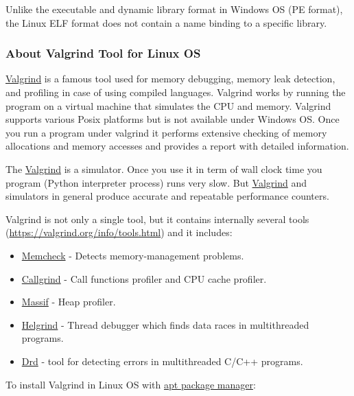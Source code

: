 \documentclass[
]{article}
\begin{document}
Unlike the executable and dynamic library format in Windows OS (PE
format), the Linux ELF format does not contain a name binding to a
specific library.

\hypertarget{about-valgrind-tool-for-linux-os}{%
\subsubsection{About Valgrind Tool for Linux
OS}\label{about-valgrind-tool-for-linux-os}}

\href{https://valgrind.org/}{Valgrind} is a famous tool used for memory
debugging, memory leak detection, and profiling in case of using
compiled languages. Valgrind works by running the program on a virtual
machine that simulates the CPU and memory. Valgrind supports various
Posix platforms but is not available under Windows OS. Once you run a
program under valgrind it performs extensive checking of memory
allocations and memory accesses and provides a report with detailed
information.

The \href{https://valgrind.org/}{Valgrind} is a simulator. Once you use
it in term of wall clock time you program (Python interpreter process)
runs very slow. But \href{https://valgrind.org/}{Valgrind} and
simulators in general produce accurate and repeatable performance
counters.

Valgrind is not only a single tool, but it contains internally several
tools (\url{https://valgrind.org/info/tools.html}) and it includes:

\begin{itemize}
\item
  \href{https://valgrind.org/docs/manual/mc-manual.html}{Memcheck} -
  Detects memory-management problems.
\item
  \href{https://valgrind.org/docs/manual/cl-manual.html}{Callgrind} -
  Call functions profiler and CPU cache profiler.
\item
  \href{https://valgrind.org/docs/manual/ms-manual.html}{Massif} - Heap
  profiler.
\item
  \href{https://valgrind.org/docs/manual/hg-manual.html}{Helgrind} -
  Thread debugger which finds data races in multithreaded programs.
\item
  \href{https://valgrind.org/docs/manual/drd-manual.html\#drd-manual.using-drd\%0A}{Drd}
  - tool for detecting errors in multithreaded C/C++ programs.
\end{itemize}

To install Valgrind in Linux OS with
\href{https://help.ubuntu.com/community/AptGet/Howto}{apt package
manager}:
\end{document}

